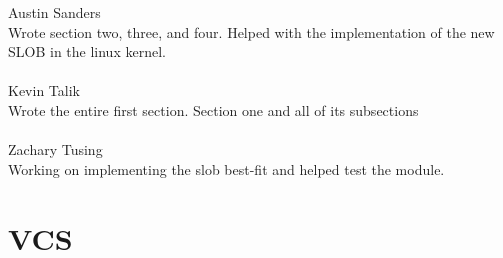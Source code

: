\documentclass[onecolumn, draftclsnofoot,10pt, compsoc]{IEEEtran}
\begin{document}
        Austin Sanders\\ 
        Wrote section two, three, and four. Helped with the implementation of the new SLOB in the linux kernel.\\
        \\
        Kevin Talik\\
        Wrote the entire first section. Section one and all of its subsections\\
        \\
        Zachary Tusing\\
        Working on implementing the slob best-fit and helped test the module.
        \\
        
        \section{VCS}
        
        
        
 
              
        
        

        
\end{document}
